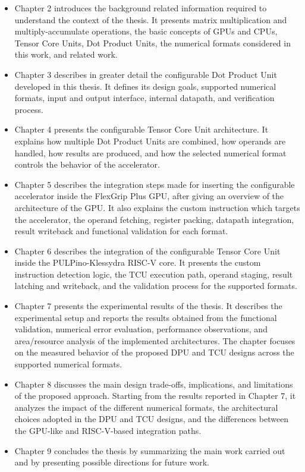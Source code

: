 \begin{itemize}

    \item Chapter 2 introduces the background related information required to understand the context of the thesis. It presents matrix multiplication and multiply-accumulate operations, the basic concepts of GPUs and CPUs, Tensor Core Units, Dot Product Units, the numerical formats considered in this work, and related work.
    \item Chapter 3 describes in greater detail the configurable Dot Product Unit developed in this thesis. It defines its design goals, supported numerical formats, input and output interface, internal datapath, and verification process.
    \item Chapter 4 presents the configurable Tensor Core Unit architecture. It explains how multiple Dot Product Units are combined, how operands are handled, how results are produced, and how the selected numerical format controls the behavior of the accelerator.
    \item Chapter 5 describes the integration steps made for inserting the configurable accelerator inside the FlexGrip Plus GPU, after giving an overview of the architecture of the GPU. It also explains the custom instruction which targets the accelerator, the operand fetching, register packing, datapath integration, result writeback and functional validation for each format.
    \item Chapter 6 describes the integration of the configurable Tensor Core Unit inside the PULPino-Klessydra RISC-V core. It presents the custom instruction detection logic, the TCU execution path, operand staging, result latching and writeback, and the validation process for the supported formats.
    \item Chapter 7 presents the experimental results of the thesis. It describes the experimental setup and reports the results obtained from the functional validation, numerical error evaluation, performance observations, and area/resource analysis of the implemented architectures. The chapter focuses on the measured behavior of the proposed DPU and TCU designs across the supported numerical formats.
    \item Chapter 8 discusses the main design trade-offs, implications, and limitations of the proposed approach. Starting from the results reported in Chapter 7, it analyzes the impact of the different numerical formats, the architectural choices adopted in the DPU and TCU designs, and the differences between the GPU-like and RISC-V-based integration paths.
    \item Chapter 9 concludes the thesis by summarizing the main work carried out and by presenting possible directions for future work.

\end{itemize}

